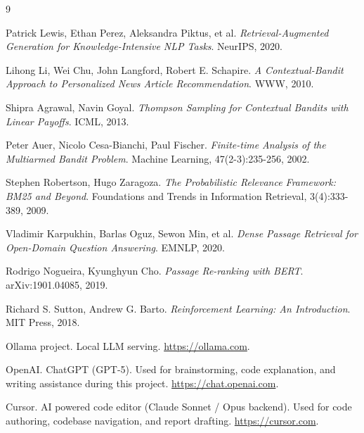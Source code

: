 \documentclass{article}
\begin{document}
\begin{thebibliography}{9}

Patrick Lewis, Ethan Perez, Aleksandra Piktus, et al.
\textit{Retrieval-Augmented Generation for Knowledge-Intensive NLP Tasks}.
NeurIPS, 2020.

Lihong Li, Wei Chu, John Langford, Robert E. Schapire.
\textit{A Contextual-Bandit Approach to Personalized News Article Recommendation}.
WWW, 2010.

Shipra Agrawal, Navin Goyal.
\textit{Thompson Sampling for Contextual Bandits with Linear Payoffs}.
ICML, 2013.

Peter Auer, Nicolo Cesa-Bianchi, Paul Fischer.
\textit{Finite-time Analysis of the Multiarmed Bandit Problem}.
Machine Learning, 47(2-3):235-256, 2002.

Stephen Robertson, Hugo Zaragoza.
\textit{The Probabilistic Relevance Framework: BM25 and Beyond}.
Foundations and Trends in Information Retrieval, 3(4):333-389, 2009.

Vladimir Karpukhin, Barlas Oguz, Sewon Min, et al.
\textit{Dense Passage Retrieval for Open-Domain Question Answering}.
EMNLP, 2020.

Rodrigo Nogueira, Kyunghyun Cho.
\textit{Passage Re-ranking with BERT}.
arXiv:1901.04085, 2019.

Richard S. Sutton, Andrew G. Barto.
\textit{Reinforcement Learning: An Introduction}.
MIT Press, 2018.

Ollama project. Local LLM serving. \url{https://ollama.com}.

OpenAI. ChatGPT (GPT-5). Used for brainstorming, code explanation, and writing assistance during this project. \url{https://chat.openai.com}.

Cursor. AI powered code editor (Claude Sonnet / Opus backend). Used for code authoring, codebase navigation, and report drafting. \url{https://cursor.com}.

\end{thebibliography}
\end{document}
